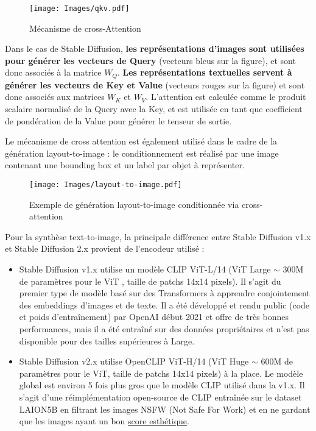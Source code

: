\documentclass{article}
\begin{document}
\begin{figure}[H]
    \centering
    \texttt{[image: Images/qkv.pdf]}
    \caption{Mécanisme de cross-Attention}
    \label{cross-attention}
\end{figure}
Dans le cas de Stable Diffusion, \textbf{les représentations d'images sont utilisées pour générer les vecteurs de Query} (vecteurs bleus sur la figure), et sont donc associés à la matrice $W_Q$. \textbf{Les représentations textuelles servent à générer les vecteurs de Key et Value} (vecteurs rouges sur la figure) et sont donc associés aux matrices $W_K$ et $W_V$. L'attention est calculée comme le produit scalaire normalisé de la Query avec la Key, et est utilisée en tant que coefficient de pondération de la Value pour générer le tenseur de sortie. \par
Le mécanisme de cross attention est également utilisé dans le cadre de la génération layout-to-image : le conditionnement est réalisé par une image contenant une bounding box et un label par objet à représenter.
\begin{figure}[H]
    \centering
    \texttt{[image: Images/layout-to-image.pdf]}
    \caption{Exemple de génération layout-to-image conditionnée via cross-attention}
\end{figure}

\noindent Pour la synthèse text-to-image, la principale différence entre Stable Diffusion v1.x et Stable Diffusion 2.x provient de l'encodeur utilisé :
\begin{itemize}
    \item Stable Diffusion v1.x utilise un modèle CLIP ViT-L/14 \cite{CLIP} (ViT Large $\sim$ 300M de paramètres pour le ViT \cite{ViT}, taille de patchs 14x14 pixels). Il s'agit du premier type de modèle basé sur des Transformers \cite{transformers} à apprendre conjointement des embeddings d'images et de texte. Il a été développé et rendu public (code et poids d'entraînement) par OpenAI début 2021 et offre de très bonnes performances, mais il a été entraîné sur des données propriétaires et n'est pas disponible pour des tailles supérieures à Large.
    \item Stable Diffusion v2.x utilise OpenCLIP ViT-H/14 \cite{OpenCLIP} (ViT Huge $\sim$ 600M de paramètres pour le ViT, taille de patchs 14x14 pixels) à la place. Le modèle global est environ 5 fois plus gros que le modèle CLIP utilisé dans la v1.x. Il s'agit d'une réimplémentation open-source de CLIP entraînée sur le dataset LAION5B \cite{LAION5B} en filtrant les images NSFW (Not Safe For Work) et en ne gardant que les images ayant un bon \href{https://github.com/christophschuhmann/improved-aesthetic-predictor}{score esthétique}.
\end{itemize}
\end{document}
